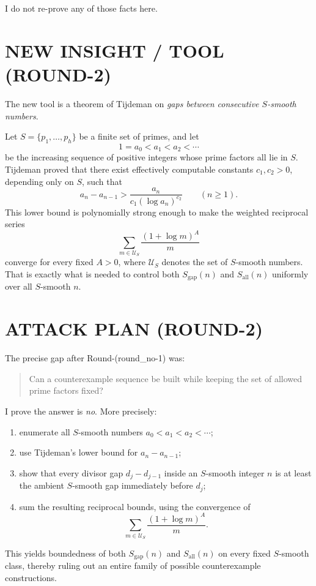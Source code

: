I do not re-prove any of those facts here.

\section{NEW INSIGHT / TOOL (ROUND-2)}

The new tool is a theorem of Tijdeman on \emph{gaps between consecutive \(S\)-smooth numbers}.

Let \(S=\{p_1,\dots,p_h\}\) be a finite set of primes, and let
\[
1=a_0<a_1<a_2<\cdots
\]
be the increasing sequence of positive integers whose prime factors all lie in \(S\). Tijdeman proved that there exist effectively computable constants \(c_1,c_2>0\), depending only on \(S\), such that
\[
a_n-a_{n-1}>\frac{a_n}{c_1(\log a_n)^{c_2}}
\qquad (n\ge 1).
\]
This lower bound is polynomially strong enough to make the weighted reciprocal series
\[
\sum_{m\in \mathcal U_S}\frac{(1+\log m)^A}{m}
\]
converge for every fixed \(A>0\), where \(\mathcal U_S\) denotes the set of \(S\)-smooth numbers. That is exactly what is needed to control both \(S_{\mathrm{gap}}(n)\) and \(S_{\mathrm{all}}(n)\) uniformly over all \(S\)-smooth \(n\).

\section{ATTACK PLAN (ROUND-2)}

The precise gap after Round-(round\_no-1) was:

\begin{quote}
Can a counterexample sequence be built while keeping the set of allowed prime factors fixed?
\end{quote}

I prove the answer is \emph{no}. More precisely:

\begin{enumerate}
\item enumerate all \(S\)-smooth numbers \(a_0<a_1<a_2<\cdots\);
\item use Tijdeman's lower bound for \(a_n-a_{n-1}\);
\item show that every divisor gap \(d_j-d_{j-1}\) inside an \(S\)-smooth integer \(n\) is at least the ambient \(S\)-smooth gap immediately before \(d_j\);
\item sum the resulting reciprocal bounds, using the convergence of
\[
\sum_{m\in \mathcal U_S}\frac{(1+\log m)^A}{m}.
\]
\end{enumerate}

This yields boundedness of both \(S_{\mathrm{gap}}(n)\) and \(S_{\mathrm{all}}(n)\) on every fixed \(S\)-smooth class, thereby ruling out an entire family of possible counterexample constructions.

